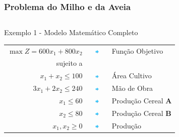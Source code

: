 \documentclass{beamer}
\begin{document}
\begin{frame}
\begin{table}
\begin{tabular}{c}
		\end{tabular}
	\end{table}
\end{frame}

\begin{frame}
	\frametitle{Problema do Milho e da Aveia}
	\begin{columns}
		\begin{column}{0.7\textwidth}
			\centering
			\begin{exampleblock}{Exemplo 1 - Modelo Matemático Completo}
				\scriptsize
				\begin{table}
					\begin{tabular}{r c l}
						$ \max Z = 600x_1+800x_2$ & \includegraphics[width=0.8cm,height=0.2cm]{seta2.png} & Função Objetivo \\
						sujeito a & & \\
						$x_1+x_2 \le 100$ & \includegraphics[width=0.8cm,height=0.2cm]{seta2.png}& Área Cultivo \\
						$3x_1+2x_2 \le 240$ & \includegraphics[width=0.8cm,height=0.2cm]{seta2.png}& Mão de Obra \\
						$x_1 \le 60 $ & \includegraphics[width=0.8cm,height=0.2cm]{seta2.png}& Produção Cereal \textbf{A} \\
						$x_2 \le 80 $ &\includegraphics[width=0.8cm,height=0.2cm]{seta2.png} & Produção Cereal \textbf{B} \\
						$x_1, x_2 \ge 0$ & \includegraphics[width=0.8cm,height=0.2cm]{seta2.png}& Produção \\
					\end{tabular}
				\end{table}
			\end{exampleblock}
		\end{column}
		\begin{column}{0.3\textwidth}

\end{column}
\end{columns}
\end{frame}
\end{document}
